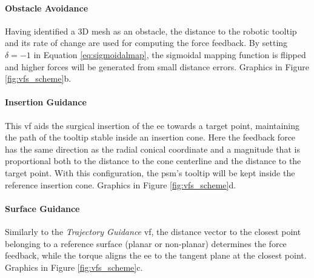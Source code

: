 \documentclass{article}
\begin{document}
\begin{multicols}{2}
\paragraph{Obstacle Avoidance} Having identified a 3D mesh as an obstacle, the distance to the robotic tooltip and its rate of change are used for computing the force feedback. By setting $\delta = -1$ in Equation \ref{eq:sigmoidalmap}, the sigmoidal mapping function is flipped and higher forces will be generated from small distance errors.  Graphics in Figure \ref{fig:vfs_scheme}b.
\paragraph{Insertion Guidance} This \ac{vf} aids the surgical insertion of the \ac{ee} towards a target point, maintaining the path of the tooltip stable inside an insertion cone. Here the feedback force has the same direction as the radial conical coordinate and a magnitude that is proportional both to the distance to the cone centerline and the distance to the target point. With this configuration, the \ac{psm}'s tooltip will be kept inside the reference insertion cone. Graphics in Figure \ref{fig:vfs_scheme}d.
\paragraph{Surface Guidance} Similarly to the \textit{Trajectory Guidance} \ac{vf}, the distance vector to the closest point belonging to a reference surface (planar or non-planar) determines the force feedback, while the torque aligns the \ac{ee} to the tangent plane at the closest point. Graphics in Figure \ref{fig:vfs_scheme}c.


\end{multicols}
\end{document}
